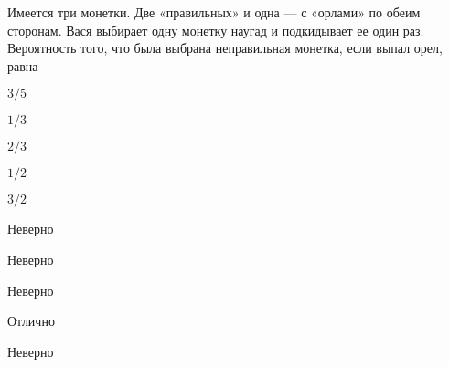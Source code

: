 
\begin{question}
Имеется три монетки. Две «правильных» и одна --- с «орлами» по обеим
сторонам. Вася выбирает одну монетку наугад и подкидывает ее один раз.
Вероятность того, что была выбрана неправильная монетка, если выпал
орел, равна
\begin{answerlist}
  \item \(3/5\)
  \item \(1/3\)
  \item \(2/3\)
  \item \(1/2\)
  \item \(3/2\)
\end{answerlist}
\end{question}

\begin{solution}
\begin{answerlist}
  \item Неверно
  \item Неверно
  \item Неверно
  \item Отлично
  \item Неверно
\end{answerlist}
\end{solution}

